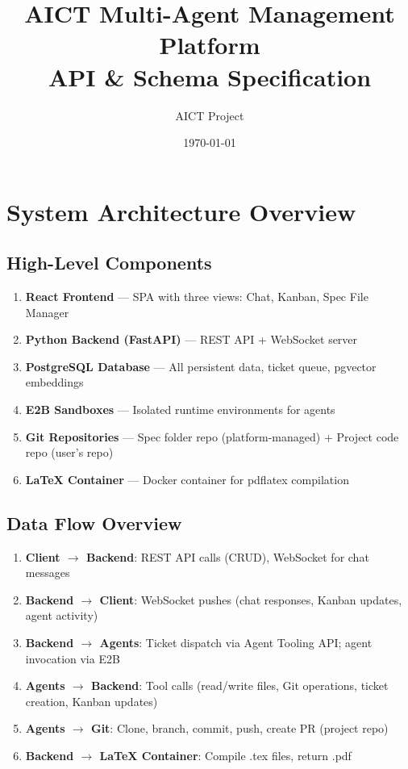 \documentclass[11pt,a4paper]{article}
\title{\textbf{AICT Multi-Agent Management Platform} \\ \Large API \& Schema Specification}
\author{AICT Project}
\date{\today}
\begin{document}
\maketitle
\tableofcontents
\newpage

\section{System Architecture Overview}

\subsection{High-Level Components}

\begin{enumerate}
  \item \textbf{React Frontend} --- SPA with three views: Chat, Kanban, Spec File Manager
  \item \textbf{Python Backend (FastAPI)} --- REST API + WebSocket server
  \item \textbf{PostgreSQL Database} --- All persistent data, ticket queue, pgvector embeddings
  \item \textbf{E2B Sandboxes} --- Isolated runtime environments for agents
  \item \textbf{Git Repositories} --- Spec folder repo (platform-managed) + Project code repo (user's repo)
  \item \textbf{LaTeX Container} --- Docker container for pdflatex compilation
\end{enumerate}

\subsection{Data Flow Overview}

\begin{enumerate}
  \item \textbf{Client $\to$ Backend}: REST API calls (CRUD), WebSocket for chat messages
  \item \textbf{Backend $\to$ Client}: WebSocket pushes (chat responses, Kanban updates, agent activity)
  \item \textbf{Backend $\to$ Agents}: Ticket dispatch via Agent Tooling API; agent invocation via E2B
  \item \textbf{Agents $\to$ Backend}: Tool calls (read/write files, Git operations, ticket creation, Kanban updates)
  \item \textbf{Agents $\to$ Git}: Clone, branch, commit, push, create PR (project repo)
  \item \textbf{Backend $\to$ LaTeX Container}: Compile .tex files, return .pdf
\end{enumerate}
\end{document}

